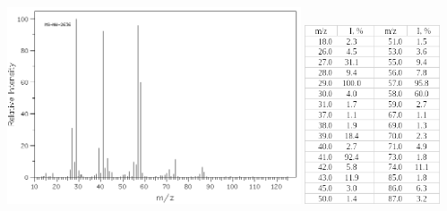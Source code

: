 \begin{minipage}{\textwidth}
  \includegraphics[width=0.65\textwidth]{problems/problem3/images/image2}
  \hspace{0.05\textwidth}
  \includegraphics[width=0.3\textwidth]{problems/problem3/images/image3}
\end{minipage}
